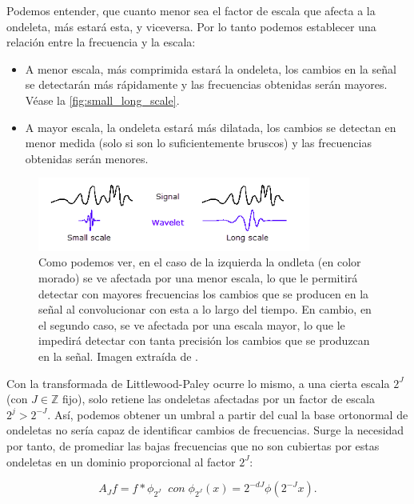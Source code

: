 \medskip
 
\noindent Podemos entender, que cuanto menor sea el factor de escala que afecta a la ondeleta, más  estará esta, y viceversa. Por lo tanto podemos establecer una relación entre la frecuencia y la escala: 

\begin{itemize}
  \item A menor escala, más comprimida estará la ondeleta, los cambios en la señal se detectarán más rápidamente y las frecuencias obtenidas serán mayores. Véase la \autoref{fig:small_long_scale}.
  \item A mayor escala, la ondeleta estará más dilatada, los cambios se detectan en menor medida (solo si son lo suficientemente bruscos) y las frecuencias obtenidas serán menores.
\end{itemize}

\begin{figure} [!h]
  \centering
  \includegraphics[width=0.8\textwidth]{img/Relacion_escala_frecuencia.png}
  \caption{Como podemos ver, en el caso de la izquierda la ondleta (en color morado) se ve afectada por una menor escala, lo que le permitirá detectar con mayores frecuencias los cambios que se producen en la señal al convolucionar con esta a lo largo del tiempo. En cambio, en el segundo caso, se ve afectada por una escala mayor, lo que le impedirá detectar con tanta precisión los cambios que se produzcan en la señal. Imagen extraída de \cite{WAVELETS}.}
  \label{fig:small_long_scale}
\end{figure}

\medskip

\noindent Con la transformada de Littlewood-Paley ocurre lo mismo, a una cierta escala $2^J$ (con $J \in \mathbb{Z}$ fijo), solo retiene las ondeletas afectadas por un factor de escala $2^j > 2^{-J}$. Así, podemos obtener un umbral a partir del cual la base ortonormal de ondeletas no sería capaz de identificar cambios de frecuencias. Surge la necesidad por tanto, de promediar las bajas frecuencias que no son cubiertas por estas ondeletas en un dominio proporcional al factor $2^J$:

\begin{equation}
  A_Jf=f \ast \phi_ {2^J} \; \; con \; \phi_ {2^J}(x)=2^{-dJ} \phi(2^{-J}x).
\end{equation}

